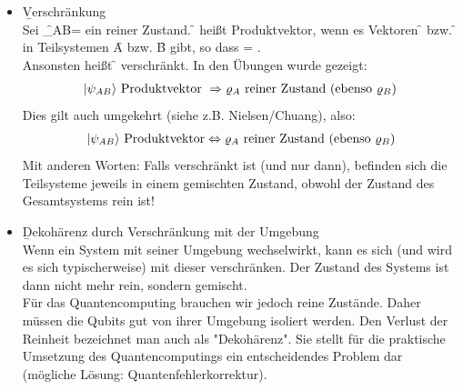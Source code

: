 \begin{itemize}
    \item \b{Verschränkung}\\
    Sei \f{\varrho_{AB}=} ein reiner Zustand. \f{} heißt Produktvektor, wenn es Vektoren \f{} bzw. \f{} in Teilsystemen \f{A} bzw. \f{B} gibt, so dass \f{ = \otimes{}}.\\
    Ansonsten heißt \f{} verschränkt. In den Übungen wurde gezeigt:
    \begin{gather*}
        |\psi_{AB}\rangle\text{ Produktvektor }\Rightarrow\varrho_A\text{ reiner Zustand (ebenso ${\varrho_B}$)}
    \end{gather*}
    Dies gilt auch umgekehrt (siehe z.B. Nielsen/Chuang), also:
    \begin{gather*}
        |\psi_{AB}\rangle\text{ Produktvektor} \Leftrightarrow \varrho_A\text{ reiner Zustand (ebenso ${\varrho_B}$)}
    \end{gather*}
    Mit anderen Worten: Falls  verschränkt ist (und nur dann), befinden sich die Teilsysteme jeweils in einem gemischten Zustand, obwohl der Zustand des Gesamtsystems rein ist!
    \item \b{Dekohärenz durch Verschränkung mit der Umgebung}\\
    Wenn ein System mit seiner Umgebung wechselwirkt, kann es sich (und wird es sich typischerweise) mit dieser verschränken. Der Zustand des Systems ist dann nicht mehr rein, sondern gemischt.\\
    Für das Quantencomputing brauchen wir jedoch reine Zustände. Daher müssen die Qubits gut von ihrer Umgebung isoliert werden. Den Verlust der Reinheit bezeichnet man auch als "Dekohärenz". Sie stellt für die praktische Umsetzung des Quantencomputings ein entscheidendes Problem dar (mögliche Lösung: Quantenfehlerkorrektur).
\end{itemize}

















